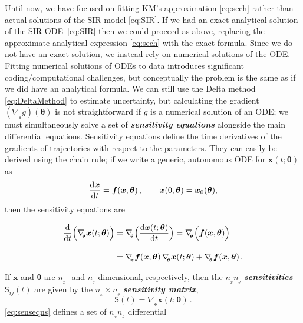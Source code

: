 \documentclass[]{interact}\usepackage[]{graphicx}\usepackage[]{xcolor}
\theoremstyle{plain}%
\theoremstyle{definition}
\theoremstyle{remark}
\newcommand{\term}[1]{{\bfseries\slshape#1}}
\newcommand{\dee}{{\rm d}}
\newcommand{\dd}[2]{{\frac{\dee{#1}}{\dee{#2}}}}
\newcommand{\ddt}[1]{\dd{#1}{t}}
\newcommand{\KM}{\protect\hyperlink{cite.KermMcKe27}{KM}\xspace}
\newcommand{\fvec}{{\bm{f}}}
\newcommand{\xvec}{{\bm{x}}}
\newcommand{\thetavec}{{\bm{\theta}}}
\newcommand{\gradtheta}{\nabla_{{}_{\!\!\thetavec}}}
\newcommand{\gradx}{\nabla_{{}_{\!\!\xvec}}}
\newcommand{\sens}{{\mathsf S}}
\newcommand{\sensmat}{{\bm{\sens}}}
\newcommand{\xindexmax}{{n_{{}_x}}}
\newcommand{\thetaindexmax}{{n_{{}_\theta}}}
\begin{document}
Until now, we have focused on fitting \KM's approximation
\eqref{eq:sech} rather than actual solutions of the SIR model
\eqref{eq:SIR}.  If we had an exact analytical solution of the SIR
ODE~\eqref{eq:SIR} then we could proceed as above, replacing the
approximate analytical expression \eqref{eq:sech} with the exact
formula.  Since we do not have an exact solution, we instead rely
on numerical solutions of the ODE.  Fitting numerical solutions of
ODEs to data introduces significant coding/computational challenges,
but conceptually the problem is the same as if we did have an
analytical formula.  We can still use the Delta method
\eqref{eq:DeltaMethod} to estimate uncertainty, but calculating the
gradient $(\gradtheta g)(\thetavec)$ is not straightforward if $g$ is
a numerical solution of an ODE; we must simultaneously solve a set of
\term{sensitivity equations} \citep[Eq.\,(6)]{raue2013lessons}
alongside the main differential equations. Sensitivity equations
define the time derivatives of the gradients of trajectories with
respect to the parameters.  They can easily be derived using the chain
rule; if we write a generic, autonomous ODE for $\xvec(t;\thetavec)$
as
\begin{equation}\label{eq:genericODE}
  \ddt{\xvec} = \fvec(\xvec,\thetavec)\,,
  \qquad \xvec(0,\thetavec) = \xvec_0(\thetavec),
\end{equation}
then the sensitivity equations are
\begin{linenomath*}
\begin{subequations}\label{eq:senseqns}
\begin{align}
\ddt{}\Big(\gradtheta\xvec(t;\thetavec)\Big)
&= \gradtheta\Big( \ddt{\xvec(t;\thetavec)} \Big)
= \gradtheta\Big( \fvec(\xvec,\thetavec) \Big) \\
\noalign{\vspace{10pt}}
&=  \gradx\fvec(\xvec,\thetavec)
    \, \gradtheta\xvec(t;\thetavec)
   +  \gradtheta\fvec(\xvec,\thetavec) \,. \label{eq:senseqns;b}
\end{align}
\end{subequations}
\end{linenomath*}
If $\xvec$ and $\thetavec$ are $\xindexmax$\!\!- and $\thetaindexmax$\!\!-dimensional,
respectively, then the $\xindexmax\thetaindexmax$ \term{sensitivities} $\sens_{ij}(t)$
are given by the $\xindexmax\times \thetaindexmax$ \term{sensitivity matrix},
\begin{equation}
\sensmat(t) = \gradtheta\xvec(t;\thetavec) \,.
\end{equation}
\cref{eq:senseqns} defines a set of $\xindexmax\thetaindexmax$ differential
\end{document}
